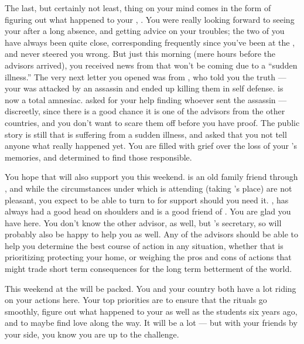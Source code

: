 \documentclass[char]{GL2020}
\begin{document}
The last, but certainly not least, thing on your mind comes in the form of figuring out what happened to your \cHeadDiplomat{\auncle}, \cHeadDiplomat{}. You were really looking forward to seeing your \cHeadDiplomat{\auncle} after a long absence, and getting \cHeadDiplomat{\their} advice on your troubles; the two of you have always been quite close, corresponding frequently since you’ve been at the \pSc{}, and \cHeadDiplomat{\they} never steered you wrong. But just this morning (mere hours before the advisors arrived), you received news from \cEbbPriest{\full} that \cHeadDiplomat{} won't be coming due to a ``sudden illness.'' The very next letter you opened was from \cJuniorStatesman{}, who told you the truth — your \cHeadDiplomat{\auncle} was attacked by an assassin and ended up killing them in self defense. \cHeadDiplomat{} is now a total amnesiac. \cJuniorStatesman{} asked for your help finding whoever sent the assassin — discreetly, since there is a good chance it is one of the advisors from the other countries, and you don't want to scare them off before you have proof. The public story is still that \cHeadDiplomat{} is suffering from a sudden illness, and \cJuniorStatesman{} asked that you not tell anyone what really happened yet. You are filled with grief over the loss of your \cHeadDiplomat{\auncle}'s memories, and determined to find those responsible. 

You hope that \cEbbPriest{} will also support you this weekend. \cEbbPriest{} is an old family friend through \cHeadDiplomat{}, and while the circumstances under which \cEbbPriest{} is attending (taking \cHeadDiplomat{}’s place) are not pleasant, you expect to be able to turn to \cEbbPriest{\them} for support should you need it. \cBunker{\full}, has always had a good head on \cBunker{\their} shoulders and is a good friend of \cHeadDiplomat{}. You are glad you have \cBunker{} here. You don’t know the other advisor, \cChupLeader{\full} as well, but \cChupLeader{\theywere} \cHeadDiplomat{}’s secretary, so \cChupLeader{\they} will probably also be happy to help you as well. Any of the advisors should be able to help you determine the best course of action in any situation, whether that is prioritizing protecting your home, or weighing the pros and cons of actions that might trade short term consequences for the long term betterment of the world.

This weekend at the \pSchool{} will be packed. You and your country both have a lot riding on your actions here. Your top priorities are to ensure that the rituals go smoothly, figure out what happened to your \cHeadDiplomat{\Auncle} \cHeadDiplomat{} as well as the students six years ago, and to maybe find love along the way. It will be a lot — but with your friends by your side, you know you are up to the challenge.
\end{document}
